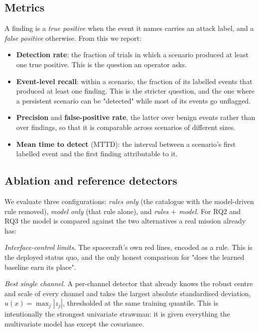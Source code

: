 \documentclass[conference]{IEEEtran}
\begin{document}
\subsection{Metrics}

A finding is a \emph{true positive} when the event it names carries an attack
label, and a \emph{false positive} otherwise. From this we report:

\begin{itemize}
  \item \textbf{Detection rate}: the fraction of trials in which a scenario
  produced at least one true positive. This is the question an operator asks.
  \item \textbf{Event-level recall}: within a scenario, the fraction of its
  labelled events that produced at least one finding. This is the stricter
  question, and the one where a persistent scenario can be "detected" while most
  of its events go unflagged.
  \item \textbf{Precision} and \textbf{false-positive rate}, the latter over
  benign events rather than over findings, so that it is comparable across
  scenarios of different sizes.
  \item \textbf{Mean time to detect} (MTTD): the interval between a scenario's
  first labelled event and the first finding attributable to it.
\end{itemize}

\subsection{Ablation and reference detectors}

We evaluate three configurations: \emph{rules only} (the catalogue with the
model-driven rule removed), \emph{model only} (that rule alone), and
\emph{rules $+$ model}. For RQ2 and RQ3 the model is compared against the two
alternatives a real mission already has:

\emph{Interface-control limits.} The spacecraft's own red lines, encoded as a
rule. This is the deployed status quo, and the only honest comparison for
"does the learned baseline earn its place".

\emph{Best single channel.} A per-channel detector that already knows the robust
centre and scale of every channel and takes the largest absolute standardised
deviation, $u(x) = \max_j |z_j|$, thresholded at the same training quantile.
This is intentionally the strongest univariate strawman: it is given everything
the multivariate model has except the covariance.
\end{document}

